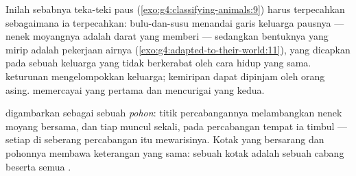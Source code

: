 \begin{example}\label{ex:g6:classification-kinship:whale}
Inilah sebabnya teka-teki paus
(\cref{exo:g4:classifying-animals:9}) harus terpecahkan sebagaimana ia
terpecahkan: bulu-dan-susu menandai garis keluarga pausnya --- nenek
moyangnya adalah  darat yang memberi  --- sedangkan
bentuknya yang mirip  adalah pekerjaan airnya
(\cref{exo:g4:adapted-to-their-world:11}), yang dicapkan pada sebuah
keluarga yang tidak berkerabat oleh cara hidup yang sama. 
keturunan mengelompokkan keluarga; kemiripan  dapat dipinjam
oleh orang asing.  memercayai yang pertama dan mencurigai
yang kedua.
\end{example}

\begin{definition}\label{def:g6:classification-kinship:tree}
 digambarkan sebagai sebuah \emph{pohon}: titik percabangannya melambangkan nenek moyang bersama,
dan tiap  muncul sekali, pada percabangan tempat ia timbul ---
setiap  di seberang percabangan itu mewarisinya. Kotak yang
bersarang dan pohonnya membawa keterangan yang sama: sebuah kotak
adalah sebuah cabang beserta semua .
\end{definition}


